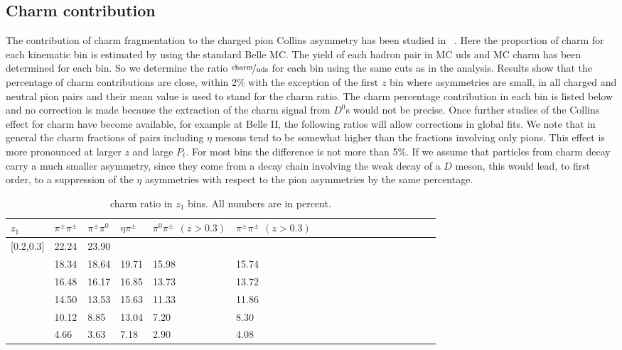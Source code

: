 \subsection{Charm contribution}
\label{sec:charmcontribution}
The contribution of charm fragmentation to the charged pion Collins asymmetry has been studied in ~\cite{ChargedPionResult2}. 
Here the proportion of charm for each kinematic bin is estimated by using the standard Belle MC. The yield of each hadron pair in MC uds and MC charm has been determined for each bin. So we determine the ratio $\nicefrac{\mathrm{charm}}{\mathrm{uds}}$ for each bin using the same cuts as in the analysis. Results show that the percentage of charm contributions are close, within 2\% with the exception of the first $z$ bin where asymmetries are small, in all charged and neutral pion pairs and their mean value is used to stand for the charm ratio. The charm percentage contribution in each bin is listed below and no correction is made because the extraction of the charm signal from $D^0$s would not be precise. Once further studies of the Collins effect for charm have become available, for example at Belle II, the following ratios will allow corrections in global fits. 
We note that in general the charm fractions of pairs including $\eta$ mesons tend to be somewhat higher than the fractions involving only pions. This effect is more pronounced at larger $z$ and large $P_t$. For most bins the difference is not more than 5\%. If we assume that particles from charm decay carry a much smaller asymmetry, since they come from a decay chain involving the weak decay of a $D$ meson, this would lead, to first order, to a suppression of the $\eta$ asymmetries with respect to the pion asymmetries by the same percentage.


\begin{table}[H]\footnotesize
\centering
\begin{tabular}{|l|l|l|l|l|l|l|l|l|l|l|l|l|l|l|l|l|l|}
\hline
$z_1$ & $\pi^{\pm}\pi^{\pm}$ & $\pi^{\pm}\pi^0$ & $\eta\pi^{\pm}$ & $\pi^0\pi^{\pm}$ $(z>0.3)$ & $\pi^{\pm}\pi^{\pm}$ $(z>0.3)$ \\ \hline
[0.2,0.3]	&	22.24	&	23.90	&		&		&		\\ \hline
[0.3,0.4]	&	18.34	&	18.64	&	19.71	&	15.98	&	15.74	\\ \hline
[0.4,0.5]	&	16.48	&	16.17	&	16.85	&	13.73	&	13.72	\\ \hline
[0.5,0.6]	&	14.50	&	13.53	&	15.63	&	11.33	&	11.86	\\ \hline
[0.6,0.7]	&	10.12	&	8.85	&	13.04	&	7.20	&	8.30	\\ \hline
[0.7,1.0]	&	4.66	&	3.63	&	7.18	&	2.90	&	4.08	\\ \hline\end{tabular}
\caption{charm ratio in $z_1$ bins. All numbers are in percent.}
\label{tab:sinzcharmratio}
\end{table}

